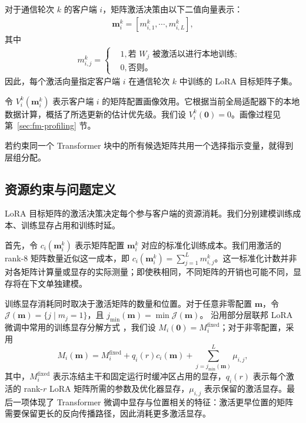 \documentclass[10pt,conference,letterpaper]{IEEEtran}
\begin{document}
对于通信轮次 $k$ 的客户端 $i$，矩阵激活决策由以下二值向量表示：
\begin{eqnarray}
\mathbf m^k_i=[{m}_{i,1}^k,\cdots,{m}_{i,L}^k],
\end{eqnarray}
其中
\begin{eqnarray}
&&{m}_{i,j}^k= \left\{
\begin{aligned}
&1,\mbox{若 $W_j$ 被激活以进行本地训练};\\
&0,\mbox{否则。}
\end{aligned}
\right.
\end{eqnarray}因此，每个激活向量指定客户端 $i$ 在通信轮次 $k$ 中训练的 LoRA 目标矩阵子集。

令 $V_i^k(\mathbf m_i^k)$ 表示客户端 $i$ 的矩阵配置画像效用。它根据当前全局适配器下的本地数据计算，概括了所选更新的估计优先级。我们设 $V_i^k(\mathbf 0)=0$。画像过程见第~\ref{sec:fm-profiling} 节。

若约束同一个 Transformer 块中的所有候选矩阵共用一个选择指示变量，就得到层组分配。

\subsection{资源约束与问题定义}
LoRA 目标矩阵的激活决策决定每个参与客户端的资源消耗。我们分别建模训练成本、训练显存占用和训练时延。

首先，令 $c_i(\mathbf m^k_i)$ 表示矩阵配置 $\mathbf m^k_i$ 对应的标准化训练成本。我们用激活的 rank-8 矩阵数量近似这一成本，即 $c_i(\mathbf m^k_i)=\sum_{j=1}^{L}m_{i,j}^k$。这一标准化计数并非对各矩阵计算量或显存的实际测量；即使秩相同，不同矩阵的开销也可能不同，显存将在下文单独建模。


训练显存消耗同时取决于激活矩阵的数量和位置。对于任意非零配置 \(\mathbf m\)，令
\(\mathcal{J}(\mathbf m)=\{j\mid m_j=1\}\)，且 \(j_{\min}(\mathbf m)=\min\mathcal{J}(\mathbf m)\)。
沿用部分层联邦 LoRA 微调中常用的训练显存分解方式 \cite{zhang2025fedhello}，我们设 \(M_i(\mathbf0)=M_i^{\mathrm{fixed}}\)；对于非零配置，采用
\begin{equation}
M_i(\mathbf m)=M_i^{\mathrm{fixed}}+q_i(r)c_i(\mathbf m)+\sum_{j=j_{\min}(\mathbf m)}^{L}\mu_{i,j},
\label{eq:memory}
\end{equation}
其中，$M_i^{\mathrm{fixed}}$ 表示冻结主干和固定运行时缓冲区占用的显存，$q_i(r)$ 表示每个激活的 rank-\(r\) LoRA 矩阵所需的参数及优化器显存，$\mu_{i,j}$ 表示保留的激活显存。最后一项体现了 Transformer 微调中显存与位置相关的特征：激活更早位置的矩阵需要保留更长的反向传播路径，因此消耗更多激活显存。
\end{document}
